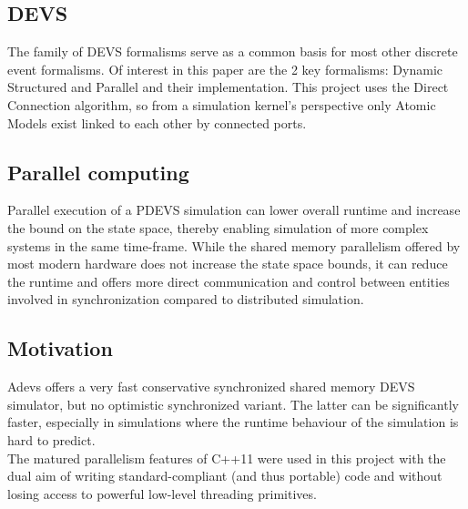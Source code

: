 \subsection{DEVS}
The family of DEVS \cite{DEVSbase} formalisms serve as a common basis for most other discrete event formalisms. Of interest in this paper are the 2 key formalisms: Dynamic Structured \cite{DSDEVS} and Parallel \cite{ParallelDEVS} and their implementation. This project uses the Direct Connection \cite{SymbolicFlattening} algorithm, so from a simulation kernel's perspective only Atomic Models exist linked to each other by connected ports.

\subsection{Parallel computing}
Parallel execution of a PDEVS simulation can lower overall runtime and increase the bound on the state space, thereby enabling simulation of more complex systems in the same time-frame.
While the shared memory parallelism offered by most modern hardware does not increase the state space bounds, it can reduce the runtime and offers more direct communication and control between entities involved in synchronization compared to distributed simulation. \\

\subsection{Motivation}
Adevs \cite{adevs} offers a very fast conservative synchronized shared memory DEVS simulator, but no optimistic synchronized variant. 
The latter can be significantly faster, especially in simulations where the runtime behaviour of the simulation is hard to predict. \\
The matured parallelism features of C++11 were used in this project with the dual aim of writing standard-compliant (and thus portable) code and without losing access to powerful low-level threading primitives. %

